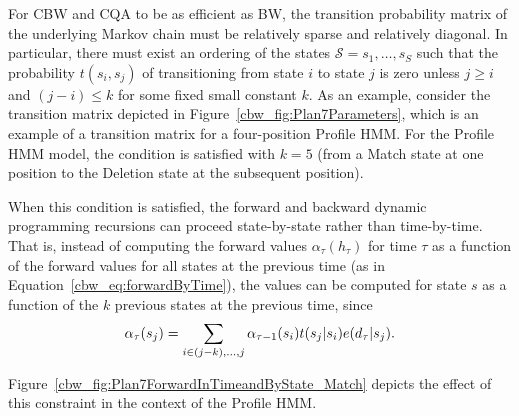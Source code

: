 \documentclass[preprint,12pt,authoryear]{elsarticle}
\newcommand{\datum}{\ensuremath{d}}
\newcommand{\hiddenState}{\ensuremath{h}}
\newcommand{\Time}{\ensuremath{\tau}}
\newcommand{\States}{\ensuremath{\mathcal{S}}}
\newcommand{\state}{\ensuremath{s}}
\newcommand{\maxState}{\ensuremath{S}}
\newcommand{\HMMtransitionLaw}{\ensuremath{t}}
\newcommand{\HMMemissionLaw}{\ensuremath{e}}
\newcommand{\forward}{\ensuremath{\alpha}}
\begin{document}
For CBW and CQA to be as efficient as BW, the transition probability matrix of the underlying Markov chain must be relatively sparse and relatively diagonal.  In particular, there must exist an ordering of the states $\States = \state_1, \dots, \state_{\maxState}$ such that the probability $t(s_i,s_j)$ of transitioning from state $i$ to state $j$ is zero unless $j \geq i$ and $(j - i) \leq k$ for some fixed small constant $k$.  As an example, consider the transition matrix depicted in Figure~\ref{cbw_fig:Plan7Parameters}, which is an example of a transition matrix for a four-position Profile HMM.  For the Profile HMM model, the condition is satisfied with $k = 5$ (from a Match state at one position to the Deletion state at the subsequent position).

When this condition is satisfied, the forward and backward dynamic programming recursions can proceed state-by-state rather than time-by-time.  That is, instead of computing the forward values $\forward_{\Time}( \hiddenState_{\Time} )$ for time $\Time$ as a function of the forward values for all states at the previous time (as in Equation~\ref{cbw_eq:forwardByTime}), the values can be computed for state $\state$ as a function of the $k$ previous states at the previous time, since
\begin{equation}\label{cbw_eq:forwardByStateStrict}
\forward_{\Time}( \state_j )
= \sum_{i \in (j-k), \dots, j}{ \forward_{\Time - 1}( \state_i ) \HMMtransitionLaw( \state_j | \state_i ) \HMMemissionLaw( \datum_{\Time} | \state_j ) } \hbox{.}
\end{equation}

Figure~\ref{cbw_fig:Plan7ForwardInTimeandByState_Match} depicts the effect of this constraint in the context of the Profile HMM.
\end{document}
